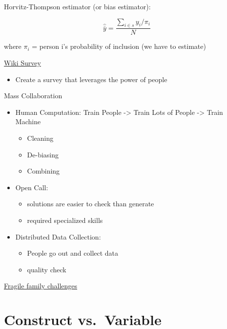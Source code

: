 \documentclass[
]{book}
\providecommand{\tightlist}{%
  \setlength{\itemsep}{0pt}\setlength{\parskip}{0pt}}
\begin{document}
Horvitz-Thompson estimator (or bias estimator):

\[
\hat{\bar{y}} = \frac{\sum_{i \in s}y_i / \pi_i}{N}
\]

where \(\pi_i\) = person i's probability of inclusion (we have to estimate)

\href{https://www.allourideas.org/}{Wiki Survey}

\begin{itemize}
\tightlist
\item
  Create a survey that leverages the power of people
\end{itemize}

Mass Collaboration

\begin{itemize}
\item
  Human Computation: Train People -\textgreater{} Train Lots of People -\textgreater{} Train Machine

  \begin{itemize}
  \item
    Cleaning
  \item
    De-biasing
  \item
    Combining
  \end{itemize}
\item
  Open Call:

  \begin{itemize}
  \item
    solutions are easier to check than generate
  \item
    required specialized skills
  \end{itemize}
\item
  Distributed Data Collection:

  \begin{itemize}
  \item
    People go out and collect data
  \item
    quality check
  \end{itemize}
\end{itemize}

\href{https://www.fragilefamilieschallenge.org/}{Fragile family challenges}

\hypertarget{construct-vs.-variable}{%
\chapter{Construct vs.~Variable}\label{construct-vs.-variable}}
\end{document}
